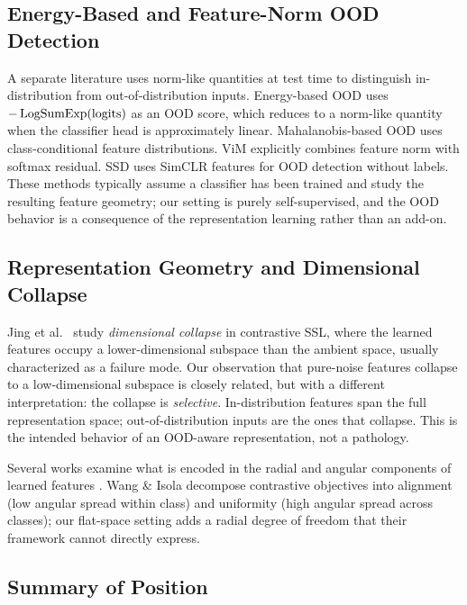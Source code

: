 \subsection{Energy-Based and Feature-Norm OOD Detection}

A separate literature uses norm-like quantities at test time to distinguish in-distribution from out-of-distribution inputs. Energy-based OOD \citep{liu2020energy} uses $-\operatorname{LogSumExp}(\text{logits})$ as an OOD score, which reduces to a norm-like quantity when the classifier head is approximately linear. Mahalanobis-based OOD \citep{lee2018mahalanobis} uses class-conditional feature distributions. ViM \citep{wang2022vim} explicitly combines feature norm with softmax residual. SSD \citep{sehwag2021ssd} uses SimCLR features for OOD detection without labels. These methods typically assume a classifier has been trained and study the resulting feature geometry; our setting is purely self-supervised, and the OOD behavior is a consequence of the representation learning rather than an add-on.

\subsection{Representation Geometry and Dimensional Collapse}

Jing et al.~\citep{jing2022dimensional} study \emph{dimensional collapse} in contrastive SSL, where the learned features occupy a lower-dimensional subspace than the ambient space, usually characterized as a failure mode. Our observation that pure-noise features collapse to a low-dimensional subspace is closely related, but with a different interpretation: the collapse is \emph{selective}. In-distribution features span the full representation space; out-of-distribution inputs are the ones that collapse. This is the intended behavior of an OOD-aware representation, not a pathology.

Several works examine what is encoded in the radial and angular components of learned features \citep{wang2020hypersphere, wang2017normface}. Wang \& Isola \citep{wang2020hypersphere} decompose contrastive objectives into alignment (low angular spread within class) and uniformity (high angular spread across classes); our flat-space setting adds a radial degree of freedom that their framework cannot directly express.

\subsection{Summary of Position}

